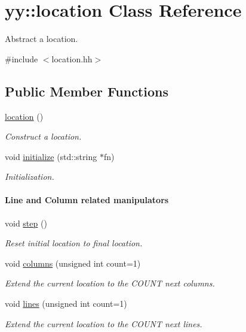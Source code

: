 \hypertarget{classyy_1_1location}{
\section{yy::location Class Reference}
\label{classyy_1_1location}
}


Abstract a location.  




{\ttfamily \#include $<$location.hh$>$}

\subsection*{Public Member Functions}
\begin{DoxyCompactItemize}
\item 
\hyperlink{classyy_1_1location_ab45f141466ffe325fba43296330d4e2d}{location} ()
\begin{DoxyCompactList}\small\item\em Construct a location. \end{DoxyCompactList}\item 
void \hyperlink{classyy_1_1location_a7f3bcd0cf46ce6edf63bc80f43b13d9f}{initialize} (std::string $\ast$fn)
\begin{DoxyCompactList}\small\item\em Initialization. \end{DoxyCompactList}\end{DoxyCompactItemize}
\begin{Indent}\paragraph*{Line and Column related manipulators}
\begin{DoxyCompactItemize}
\item 
void \hyperlink{classyy_1_1location_a96620cec8dd8ebfc96c60a03c10154d0}{step} ()
\begin{DoxyCompactList}\small\item\em Reset initial location to final location. \end{DoxyCompactList}\item 
void \hyperlink{classyy_1_1location_a044d2ef2831243279beb5e1b93ffca39}{columns} (unsigned int count=1)
\begin{DoxyCompactList}\small\item\em Extend the current location to the COUNT next columns. \end{DoxyCompactList}\item 
void \hyperlink{classyy_1_1location_af05c5d78c5a53fb3aa4ef4e34c9eb723}{lines} (unsigned int count=1)
\begin{DoxyCompactList}\small\item\em Extend the current location to the COUNT next lines. \end{DoxyCompactList}\end{DoxyCompactItemize}
\end{Indent}
